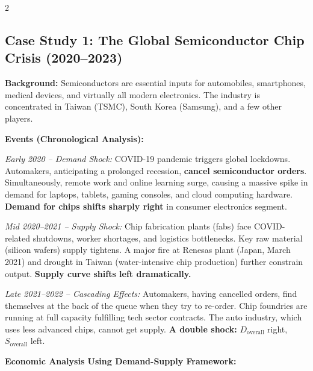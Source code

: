 \documentclass[10pt,a4paper]{article}
\begin{document}
\begin{multicols}{2}
\subsection*{Case Study 1: The Global Semiconductor Chip Crisis (2020--2023)}

\textbf{Background:} Semiconductors are essential inputs for automobiles, smartphones, medical devices, and virtually all modern electronics. The industry is concentrated in Taiwan (TSMC), South Korea (Samsung), and a few other players.

\textbf{Events (Chronological Analysis):}

\textit{Early 2020 -- Demand Shock:} COVID-19 pandemic triggers global lockdowns. Automakers, anticipating a prolonged recession, \textbf{cancel semiconductor orders}. Simultaneously, remote work and online learning surge, causing a massive spike in demand for laptops, tablets, gaming consoles, and cloud computing hardware. \textbf{Demand for chips shifts sharply right} in consumer electronics segment.

\textit{Mid 2020--2021 -- Supply Shock:} Chip fabrication plants (fabs) face COVID-related shutdowns, worker shortages, and logistics bottlenecks. Key raw material (silicon wafers) supply tightens. A major fire at Renesas plant (Japan, March 2021) and drought in Taiwan (water-intensive chip production) further constrain output. \textbf{Supply curve shifts left dramatically.}

\textit{Late 2021--2022 -- Cascading Effects:} Automakers, having cancelled orders, find themselves at the back of the queue when they try to re-order. Chip foundries are running at full capacity fulfilling tech sector contracts. The auto industry, which uses less advanced chips, cannot get supply. \textbf{A double shock:} $D_{\text{overall}}$ right, $S_{\text{overall}}$ left.

\textbf{Economic Analysis Using Demand-Supply Framework:}

\begin{center}
\end{center}


\end{multicols}
\end{document}
